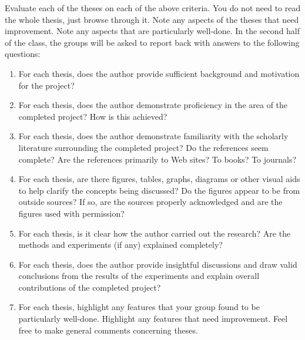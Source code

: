 Evaluate each of the theses on each of the above criteria. You do not need to read the whole thesis, just browse through it. Note any
aspects of the theses that need improvement. Note any aspects that
are particularly well-done. In the second half of the class, the groups will be asked
to report back with answers to the following questions:
\begin{enumerate}
\item
For each thesis, does the author provide sufficient background
and motivation for the project?
\item
For each thesis, does the author demonstrate proficiency in the area
of the completed project? How is this achieved?
\item
For each thesis, does the author demonstrate familiarity with the
scholarly literature surrounding the completed project? Do the
references seem complete? Are the references primarily to Web sites? To
books? To journals?
\item
For each thesis, are there figures, tables, graphs, diagrams or other
visual aids to help clarify the concepts being discussed? Do the
figures appear to be from outside sources? If so, are the
sources properly acknowledged and are the figures used with permission?
\item
For each thesis, is it clear how the author carried out
the research? Are the methods and experiments (if any) explained completely?
\item 
For each thesis, does the author provide insightful discussions and draw valid conclusions from the results of the experiments and explain overall contributions of the completed project? 
\item
For each thesis, highlight any features that your group found to be
particularly well-done. Highlight any features that need improvement.
Feel free to make general comments concerning theses.
\end{enumerate}



